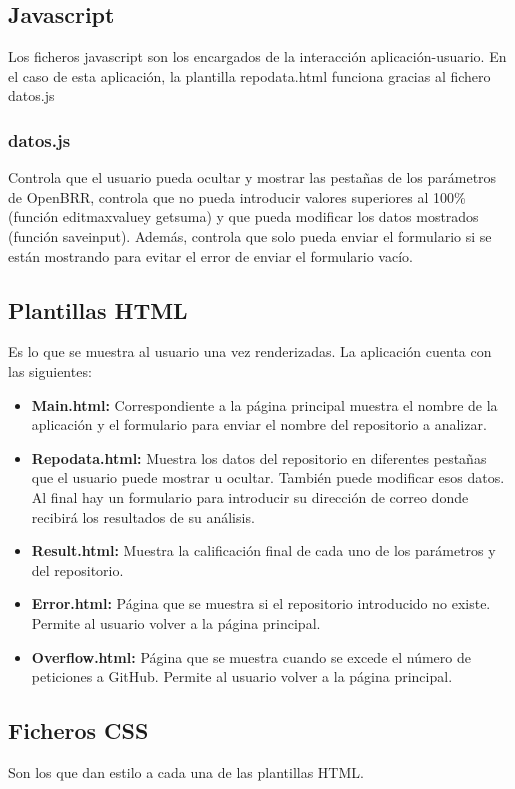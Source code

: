 \documentclass[a4paper, 12pt]{book}
\begin{document}
\subsection{Javascript}
Los ficheros javascript son los encargados de la interacción aplicación-usuario. En el caso de esta aplicación, la plantilla repo\textunderscore data.html funciona gracias al fichero datos.js
\subsubsection{datos.js}
Controla que el usuario pueda ocultar y mostrar las pestañas de los parámetros de OpenBRR, controla que no pueda introducir valores superiores al 100\% (función edit\textunderscore max\textunderscore value\textunderscore [parámetro] y get\textunderscore suma) y que pueda modificar los datos mostrados (función save\textunderscore input\textunderscore [parámetro]). Además, controla que solo pueda enviar el formulario si se están mostrando para evitar el error de enviar el formulario vacío.
\subsection{Plantillas HTML}
Es lo que se muestra al usuario una vez renderizadas. La aplicación cuenta con las siguientes:
\begin{itemize}
	\item \textbf{Main.html:} Correspondiente a la página principal muestra el nombre de la aplicación y el formulario para enviar el nombre del repositorio a analizar.
	\item \textbf{Repo\textunderscore data.html:} Muestra los datos del repositorio en diferentes pestañas que el usuario puede mostrar u ocultar. También puede modificar esos datos. Al final hay un formulario para introducir su dirección de correo donde recibirá los resultados de su análisis.
	\item \textbf{Result.html:} Muestra la calificación final de cada uno de los parámetros y del repositorio.
	\item \textbf{Error.html:} Página que se muestra si el repositorio introducido no existe. Permite al usuario volver a la página principal.
	\item \textbf{Overflow.html:} Página que se muestra cuando se excede el número de peticiones a GitHub. Permite al usuario volver a la página principal.
\end{itemize}
\subsection{Ficheros CSS}
Son los que dan estilo a cada una de las plantillas HTML.
\end{document}
